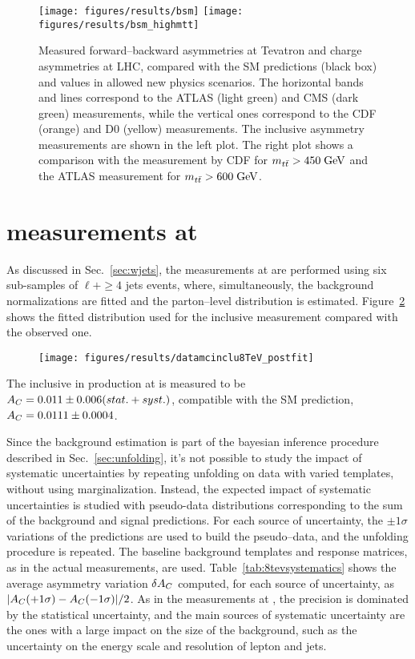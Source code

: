 \begin{figure}[!htb]
  \centering
  \texttt{[image: figures/results/bsm]}
  \texttt{[image: figures/results/bsm\_highmtt]}
  \caption{Measured forward--backward asymmetries \afb{} at Tevatron
    and charge asymmetries \ac{} at LHC, compared with the SM
    predictions (black box) and values in allowed new physics
    scenarios. The horizontal bands and lines correspond to the ATLAS
    (light green) and CMS (dark green) measurements, while the
    vertical ones correspond to the CDF (orange) and D0 (yellow)
    measurements. The inclusive asymmetry measurements are shown in
    the left plot. The right plot shows a comparison with the \afb{}
    measurement by CDF for $m_{t\bar{t}}{} > 450 \; \mathrm{GeV}{}$ and the ATLAS \ac{}
    measurement for $m_{t\bar{t}}{} > 600 \; \mathrm{GeV}{}$.}
  \label{fig:summarybsm}
\end{figure}


\section{\ac{} measurements at \eighttev{}}
\label{sec:res8tev}

As discussed in Sec.~\ref{sec:wjets}, the measurements at \eighttev{}
are performed using six sub-samples of $\ell{}+\ge4$ jets events,
where, simultaneously, the background normalizations are fitted and
the parton--level \dy{} distribution is
estimated. Figure~\ref{fig:dy8tev} shows the fitted distribution used
for the inclusive \ac{} measurement compared with the observed one.
\begin{figure}[!htb]\centering
  \texttt{[image: figures/results/datamcinclu8TeV\_postfit]} 
  \caption{}
  \label{fig:dy8tev}
\end{figure}
The inclusive \ac{} in \ttbar{} production at \eighttev{} is measured to be
$A_C{}= 0.011\pm0.006(stat.+syst.)$, compatible with the SM prediction,
$A_C{}=0.0111\pm0.0004$. 

Since the background estimation is part of the bayesian inference
procedure described in Sec.~\ref{sec:unfolding}, it's not possible to
study the impact of systematic uncertainties by repeating unfolding on data with
varied templates, without using marginalization. Instead, the expected
impact of systematic uncertainties is studied with pseudo-data distributions
corresponding to the sum of the background and signal predictions.
For each source of uncertainty, the $\pm{}1\sigma$ variations of the
predictions are used to build the pseudo--data, and the unfolding
procedure is repeated. The baseline background templates and response
matrices, as in the actual measurements, are used.
Table~\ref{tab:8tevsystematics} shows the average asymmetry variation
$\delta{\ensuremath{A_C}{}}$ computed, for each source of uncertainty, as
$|A_C{}(+1\sigma)-A_C{}(-1\sigma)|/2$.
As in the measurements at \seventev{}, the precision is dominated by
the statistical uncertainty, and the main sources of systematic
uncertainty are the ones with a large impact on the size of the
\wjets{} background, such as the uncertainty on the energy scale and
resolution of lepton and jets. 

